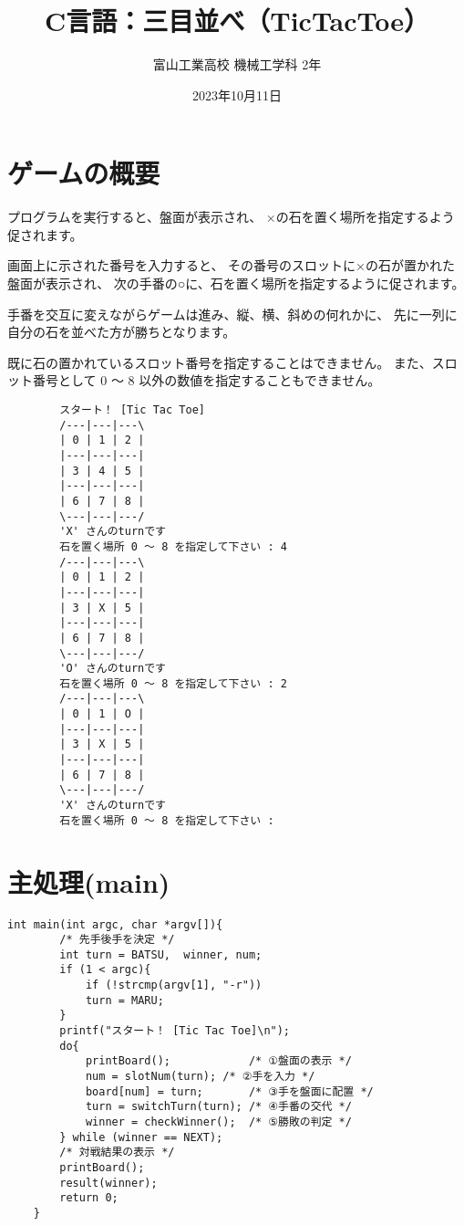 \documentclass[uplatex,a4paper,11pt,oneside,openany]{jsarticle}
\begin{document}
	\title{C言語：三目並べ（TicTacToe）}
	\author{富山工業高校 機械工学科 2年}
	\date{2023年10月11日}
	\maketitle
	\pagestyle{empty}

\newpage
	
\section{ゲームの概要}

プログラムを実行すると、盤面が表示され、
×の石を置く場所を指定するよう促されます。

画面上に示された番号を入力すると、
その番号のスロットに×の石が置かれた盤面が表示され、
次の手番の○に、石を置く場所を指定するように促されます。

手番を交互に変えながらゲームは進み、縦、横、斜めの何れかに、
先に一列に自分の石を並べた方が勝ちとなります。

既に石の置かれているスロット番号を指定することはできません。
また、スロット番号として 0 〜 8 以外の数値を指定することもできません。

\begin{spacing}{0.74}
	\begin{verbatim}
		スタート！ [Tic Tac Toe]
		/---|---|---\
		| 0 | 1 | 2 |
		|---|---|---|
		| 3 | 4 | 5 |
		|---|---|---|
		| 6 | 7 | 8 |
		\---|---|---/
		'X' さんのturnです
		石を置く場所 0 〜 8 を指定して下さい : 4
		/---|---|---\
		| 0 | 1 | 2 |
		|---|---|---|
		| 3 | X | 5 |
		|---|---|---|
		| 6 | 7 | 8 |
		\---|---|---/
		'O' さんのturnです
		石を置く場所 0 〜 8 を指定して下さい : 2
		/---|---|---\
		| 0 | 1 | O |
		|---|---|---|
		| 3 | X | 5 |
		|---|---|---|
		| 6 | 7 | 8 |
		\---|---|---/
		'X' さんのturnです
		石を置く場所 0 〜 8 を指定して下さい :
	\end{verbatim}
\end{spacing}

\newpage

\section{主処理(main)}

\begin{lstlisting}[]
	int main(int argc, char *argv[]){
		/* 先手後手を決定 */
		int turn = BATSU,  winner, num;
		if (1 < argc){
			if (!strcmp(argv[1], "-r"))
			turn = MARU;
		}
		printf("スタート！ [Tic Tac Toe]\n");
		do{
			printBoard();            /* ①盤面の表示 */
			num = slotNum(turn); /* ②手を入力 */
			board[num] = turn;       /* ③手を盤面に配置 */
			turn = switchTurn(turn); /* ④手番の交代 */
			winner = checkWinner();  /* ⑤勝敗の判定 */
		} while (winner == NEXT);
		/* 対戦結果の表示 */
		printBoard();
		result(winner);
		return 0;
	}
\end{lstlisting}
\end{document}
